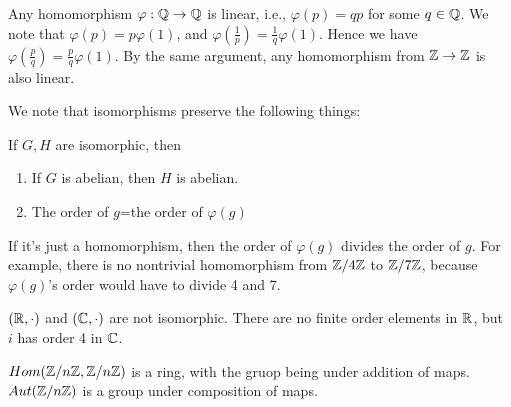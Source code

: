 \begin{example}
    Any homomorphism $\varphi: \mathbb{Q}\to\mathbb{Q}$ is linear, i.e., $\varphi(p)=qp$ for some $q\in\mathbb{Q}$. We note that $\varphi(p)=p\varphi(1)$, and $\varphi\left(\frac{1}{p}\right)=\frac{1}{q}\varphi(1)$. Hence we have $\varphi\left(\frac{p}{q}\right)=\frac{p}{q}\varphi(1)$. By the same argument, any homomorphism from $\mathbb{Z}\to\mathbb{Z}$ is also linear.
\end{example}

We note that isomorphisms preserve the following things:
\begin{prop}
    If $G,H$ are isomorphic, then 
    \begin{enumerate}
        \item If $G$ is abelian, then $H$ is abelian.
        \item The order of $g$=the order of $\varphi(g)$
    \end{enumerate}
    If it's just a homomorphism, then the order of $\varphi(g)$ divides the order of $g$. For example, there is no nontrivial homomorphism from $\mathbb{Z}/4\mathbb{Z}$ to $\mathbb{Z}/7\mathbb{Z}$, because $\varphi(g)$'s order would have to divide 4 and 7.
\end{prop}
\begin{example}
    $(\mathbb{R}, \cdot)$ and $(\mathbb{C}, \cdot)$ are not isomorphic. There are no finite order elements in $\mathbb{R}$, but $i$ has order 4 in $\mathbb{C}$.
\end{example}

\begin{example}
    $Hom(\mathbb{Z}/n\mathbb{Z}, \mathbb{Z}/n\mathbb{Z})$ is a ring, with the gruop being under addition of maps. $Aut(\mathbb{Z}/n\mathbb{Z})$ is a group under composition of maps.
\end{example}

